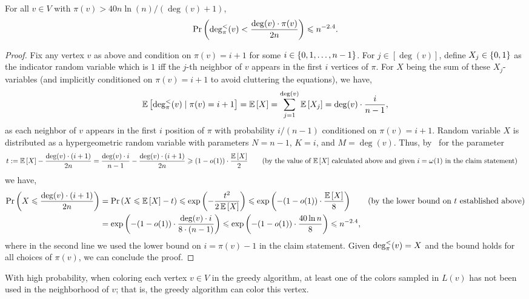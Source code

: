 	\begin{claim}\label{clm:apst-a(v)}
		For all $v \in V$ with $\pi(v) > 40n\ln(n)/(\deg(v)+1)$, 
		\[
		\operatorname*{\textnormal{Pr}}\left(\deg^{<}_{\pi}(v) < \frac{\deg(v) \cdot \pi(v)}{2n}\right) \leqslant n^{-2.4}.
		\]
	\end{claim}
	\begin{proof}
		Fix any vertex $v$ as above and condition on $\pi(v) = i+1$ for some $i \in \left\{ 0,1,\ldots,n-1 \right\}$. 
		For $j \in [\deg(v)]$, define $X_j \in \left\{ 0,1 \right\}$ as the 
		indicator random variable which is $1$ iff the $j$-th neighbor of $v$ appears in the first $i$ vertices of $\pi$. 
		For $X$ being the sum of these $X_j$-variables (and implicitly conditioned on $\pi(v) = i+1$ to avoid cluttering the equations), we have, 
		\[
		\operatorname*{{\mathbb{E}}}\left[\deg^{<}_{\pi}(v) \mid \pi(v)=i+1\right] = \operatorname*{{\mathbb{E}}}\left[X\right] = \sum_{j=1}^{\deg(v)} \operatorname*{{\mathbb{E}}}\left[X_j\right] = \deg(v) \cdot \frac{i}{n-1},
		\]
		as each neighbor of $v$ appears in the first $i$ position of $\pi$ with probability $i/(n-1)$ conditioned on $\pi(v) = i+1$.  
		Random variable $X$ is distributed as a hypergeometric random variable with parameters $N=n-1$, $K = i$, and $M = \deg(v)$. Thus, by~ for the parameter
		\begin{align}
		t &:=  \expect{X} - \frac{\deg(v)\cdot (i+1)}{2n} = \frac{\deg(v) \cdot i}{n-1} - \frac{\deg(v)\cdot (i+1)}{2n} \geq  (1-o(1)) \cdot \frac{\expect{X}}{2}  \tag{by the value of $\expect{X}$ calculated above and given $i = \omega(1)$ in the claim statement}
		\end{align} 
		we have, 
		\begin{align*}
			\operatorname*{\textnormal{Pr}}\left(X \leqslant \frac{\deg(v)\cdot (i+1)}{2n}\right) &= \operatorname*{\textnormal{Pr}}\left(X \leqslant \operatorname*{{\mathbb{E}}}\left[X\right] - t\right) \leqslant \exp\left(-\frac{t^2}{2\operatorname*{{\mathbb{E}}}\left[X\right]}\right) \leqslant \exp\left(-(1-o(1)) \cdot \frac{\operatorname*{{\mathbb{E}}}\left[X\right]}{8}\right) \tag{by the lower bound on $t$ established above} \\
			&= \exp\left(-(1-o(1)) \cdot \frac{\deg(v) \cdot i}{8 \cdot (n-1)}\right) \leqslant \exp\left(-(1-o(1)) \cdot \frac{40\ln{n}}{8}\right) \leqslant n^{-2.4},
		\end{align*}
		where in the second line we used the lower bound on $i = \pi(v)-1$ in the claim statement. 
		Given $\deg^{<}_{\pi}(v) = X$ and the bound holds for all choices of $\pi(v)$, we can conclude the proof. 
		
	\end{proof}
	\begin{lemma}\label{clm:apst-colorability}
		With high probability, when coloring each vertex $v \in V$ in the greedy algorithm, 
		at least one of the colors sampled in $L(v)$ has not been used in the neighborhood of $v$; that is, the greedy algorithm can color this vertex. 
	\end{lemma}
